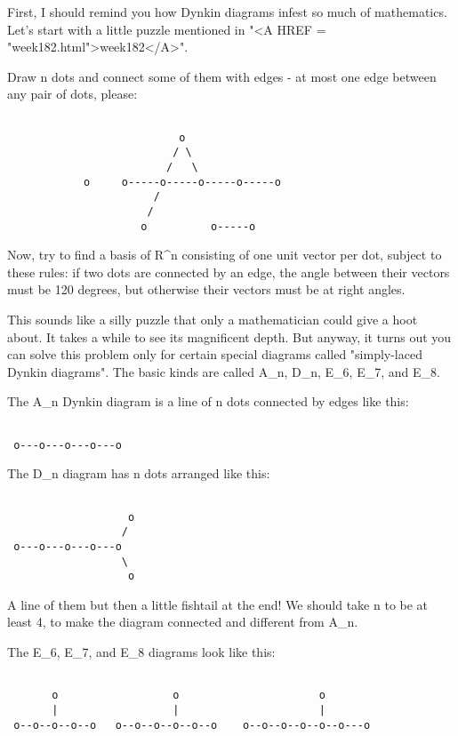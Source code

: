 First, I should remind you how Dynkin diagrams infest so much of
mathematics.  Let's start with a little puzzle mentioned in "<A HREF = "week182.html">week182</A>".

Draw n dots and connect some of them with edges - at most one edge 
between any pair of dots, please:


\begin{verbatim}

                           o
                          / \
                         /   \
            o     o-----o-----o-----o-----o
                       /
                      /
                     o          o-----o

\end{verbatim}
    
Now, try to find a basis of R^{n} 
consisting of one unit vector per dot, 
subject to these rules: if two dots are connected by an edge, the angle 
between their vectors must be 120 degrees, but otherwise their vectors 
must be at right angles. 

This sounds like a silly puzzle that only a mathematician could give a 
hoot about.  It takes a while to see its magnificent depth.   But anyway, 
it turns out you can solve this problem only for certain special diagrams 
called "simply-laced Dynkin diagrams".  The basic kinds are called A_{n}, 
D_{n}, E_{6}, E_{7}, and E_{8}.

The A_{n} Dynkin diagram is a line of n dots connected by edges like this:


\begin{verbatim}

 o---o---o---o---o    
\end{verbatim}
    

The D_{n} diagram has n dots arranged like this:


\begin{verbatim}

                   o
                  /
 o---o---o---o---o
                  \
                   o
\end{verbatim}
    
A line of them but then a little fishtail at the end!  We should
take n to be at least 4, to make the diagram connected and different
from A_{n}.

The E_{6}, E_{7}, and E_{8} diagrams look like this:


\begin{verbatim}

       o                  o                      o
       |                  |                      |
 o--o--o--o--o   o--o--o--o--o--o    o--o--o--o--o--o---o
\end{verbatim}
    

